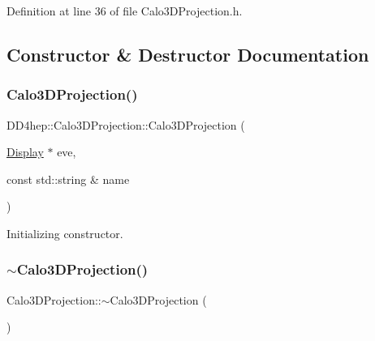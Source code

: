 Definition at line 36 of file Calo3\+D\+Projection.\+h.



\subsection{Constructor \& Destructor Documentation}
\hypertarget{class_d_d4hep_1_1_calo3_d_projection_a919a663da0171fe6025081f6daa5cf23}{}\label{class_d_d4hep_1_1_calo3_d_projection_a919a663da0171fe6025081f6daa5cf23} 
\subsubsection{\texorpdfstring{Calo3\+D\+Projection()}{Calo3DProjection()}}
{\footnotesize\ttfamily D\+D4hep\+::\+Calo3\+D\+Projection\+::\+Calo3\+D\+Projection (\begin{DoxyParamCaption}\item[{\hyperlink{class_d_d4hep_1_1_display}{Display} $\ast$}]{eve,  }\item[{const std\+::string \&}]{name }\end{DoxyParamCaption})}



Initializing constructor. 

\hypertarget{class_d_d4hep_1_1_calo3_d_projection_a21d41d0b38ff49b6e51f7d780a82351c}{}\label{class_d_d4hep_1_1_calo3_d_projection_a21d41d0b38ff49b6e51f7d780a82351c} 
\subsubsection{\texorpdfstring{$\sim$\+Calo3\+D\+Projection()}{~Calo3DProjection()}}
{\footnotesize\ttfamily Calo3\+D\+Projection\+::$\sim$\+Calo3\+D\+Projection (\begin{DoxyParamCaption}{ }\end{DoxyParamCaption})\hspace{0.3cm}{\ttfamily [virtual]}}



